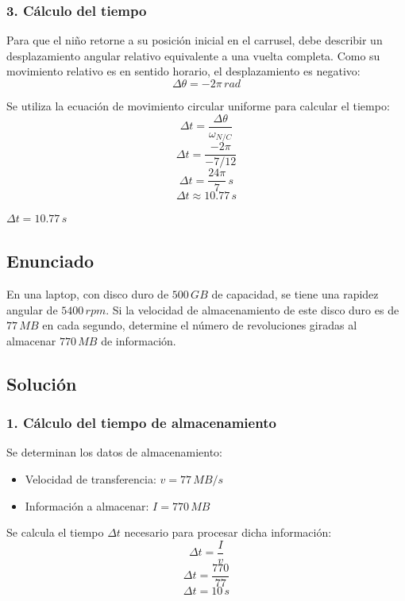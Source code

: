 \documentclass[12pt, a4paper]{article}
\begin{document}
\subsubsection*{3. Cálculo del tiempo}
Para que el niño retorne a su posición inicial en el carrusel, debe describir un desplazamiento angular relativo equivalente a una vuelta completa. Como su movimiento relativo es en sentido horario, el desplazamiento es negativo:
$$ \Delta\theta = -2\pi \, \si{rad} $$

Se utiliza la ecuación de movimiento circular uniforme para calcular el tiempo:
$$ \Delta t = \frac{\Delta\theta}{\omega_{N/C}} $$
$$ \Delta t = \frac{-2\pi}{-7/12} $$
$$ \Delta t = \frac{24\pi}{7} \, \si{s} $$
$$ \Delta t \approx 10.77 \, \si{s} $$

\begin{tcolorbox}[colback=green!5!white, colframe=green!50!black, title=Respuesta Final]
\centering \Large $\Delta t = 10.77 \, \si{s}$
\end{tcolorbox}

\newpage

\subsection*{Enunciado}
En una laptop, con disco duro de $500 \, \si{GB}$ de capacidad, se tiene una rapidez angular de $5400 \, \si{rpm}$. Si la velocidad de almacenamiento de este disco duro es de $77 \, \si{MB}$ en cada segundo, determine el número de revoluciones giradas al almacenar $770 \, \si{MB}$ de información.

\subsection*{Solución}

\subsubsection*{1. Cálculo del tiempo de almacenamiento}
Se determinan los datos de almacenamiento:
\begin{itemize}
    \item Velocidad de transferencia: $v = 77 \, \si{MB/s}$
    \item Información a almacenar: $I = 770 \, \si{MB}$
\end{itemize}

Se calcula el tiempo $\Delta t$ necesario para procesar dicha información:
$$ \Delta t = \frac{I}{v} $$
$$ \Delta t = \frac{770}{77} $$
$$ \Delta t = 10 \, \si{s} $$
\end{document}
